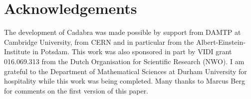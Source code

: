 \documentclass[11pt]{article}
\begin{document}
\vfill\eject

\section*{Acknowledgements}

The development of Cadabra was made possible by support from
DAMTP at Cambridge University, from CERN and in particular from the
Albert-Einstein-Institute in Potsdam.  This work was also sponsored in
part by VIDI grant 016.069.313 from the Dutch Organisation for
Scientific Research (NWO).  I am grateful to the Department of
Mathematical Sciences at Durham University for hospitality while this
work was being completed. Many thanks to Marcus Berg for comments on
the first version of this paper.

%
%
\end{document}
